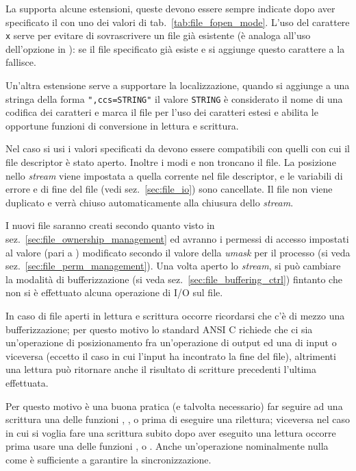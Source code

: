 La  supporta alcune estensioni, queste devono essere sempre
indicate dopo aver specificato il  con uno dei valori di
tab.~\ref{tab:file_fopen_mode}. L'uso del carattere \texttt{x} serve per
evitare di sovrascrivere un file già esistente (è analoga all'uso dell'opzione
 in ): se il file specificato già esiste e si
aggiunge questo carattere a  la  fallisce.

Un'altra estensione serve a supportare la localizzazione, quando si
aggiunge a  una stringa della forma \verb|",ccs=STRING"| il
valore \verb|STRING| è considerato il nome di una codifica dei caratteri
e  marca il file per l'uso dei caratteri estesi e abilita le
opportune funzioni di conversione in lettura e scrittura.

Nel caso si usi  i valori specificati da  devono
essere compatibili con quelli con cui il file descriptor è stato aperto.
Inoltre i modi  e  non troncano il file. La posizione nello
\textit{stream} viene impostata a quella corrente nel file descriptor, e le
variabili di errore e di fine del file (vedi sez.~\ref{sec:file_io}) sono
cancellate. Il file non viene duplicato e verrà chiuso automaticamente alla
chiusura dello \textit{stream}.

I nuovi file saranno creati secondo quanto visto in
sez.~\ref{sec:file_ownership_management} ed avranno i permessi di accesso
impostati al valore
 (pari a
) modificato secondo il valore della \textit{umask} per il processo
(si veda sez.~\ref{sec:file_perm_management}). Una volta aperto lo
\textit{stream}, si può cambiare la modalità di bufferizzazione (si veda
sez.~\ref{sec:file_buffering_ctrl}) fintanto che non si è effettuato alcuna
operazione di I/O sul file.

In caso di file aperti in lettura e scrittura occorre ricordarsi che c'è
di mezzo una bufferizzazione; per questo motivo lo standard ANSI C
richiede che ci sia un'operazione di posizionamento fra un'operazione
di output ed una di input o viceversa (eccetto il caso in cui l'input ha
incontrato la fine del file), altrimenti una lettura può ritornare anche
il risultato di scritture precedenti l'ultima effettuata. 

Per questo motivo è una buona pratica (e talvolta necessario) far seguire ad
una scrittura una delle funzioni , ,  o
 prima di eseguire una rilettura; viceversa nel caso in cui si
voglia fare una scrittura subito dopo aver eseguito una lettura occorre prima
usare una delle funzioni ,  o . Anche
un'operazione nominalmente nulla come  è
sufficiente a garantire la sincronizzazione.

